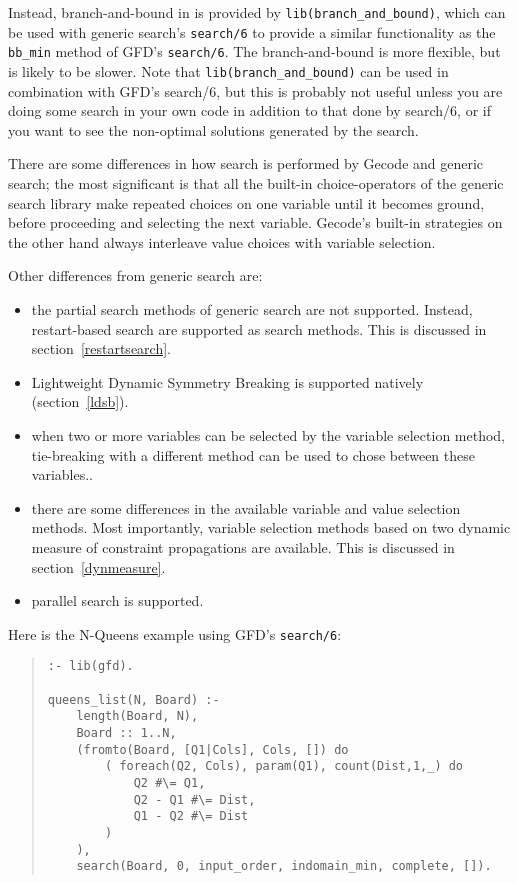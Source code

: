 Instead, branch-and-bound in {\eclipse} is provided by {\tt lib(branch_and_bound)}, which can
be used with generic search's {\tt search/6} to provide a similar functionality as
the {\tt bb_min} method of GFD's {\tt search/6}. The {\eclipse} branch-and-bound is more 
flexible, but is likely to be slower. Note that {\tt lib(branch_and_bound)} can
be used in combination with GFD's search/6, but this is probably not useful
unless you are doing some search in your own code in addition to that done by 
search/6, or if you want to see the non-optimal solutions generated by the
search.


There are some differences in how search is performed by Gecode and generic
search;
the most significant is that all the built-in choice-operators of the generic
search library make repeated choices on one variable until it becomes ground,
before proceeding and selecting the next variable.  Gecode's built-in
strategies on the other hand always interleave value choices with variable
selection.

Other differences from generic search are: 
\begin{itemize} 

\item the partial search methods of generic search are not supported.
Instead, restart-based search are supported as search methods. This is 
discussed in section~\ref{restartsearch}.
\item Lightweight Dynamic Symmetry Breaking is supported natively 
(section~\ref{ldsb}).
\item when two or more variables can be selected by the variable selection
method, tie-breaking with a different method can be  used to chose between
these variables..
\item there are some differences in the available variable and value 
selection methods. Most importantly, variable selection methods based
on two dynamic measure of constraint propagations are available. This
is discussed in section~\ref{dynmeasure}.
\item parallel search is supported.
\end{itemize}

Here is the N-Queens example using GFD's \texttt{search/6}:
\begin{quote}
\begin{verbatim}
:- lib(gfd).

queens_list(N, Board) :-
    length(Board, N),
    Board :: 1..N,
    (fromto(Board, [Q1|Cols], Cols, []) do
        ( foreach(Q2, Cols), param(Q1), count(Dist,1,_) do
            Q2 #\= Q1,
            Q2 - Q1 #\= Dist,
            Q1 - Q2 #\= Dist
        )
    ),
    search(Board, 0, input_order, indomain_min, complete, []).
\end{verbatim}
\end{quote}



